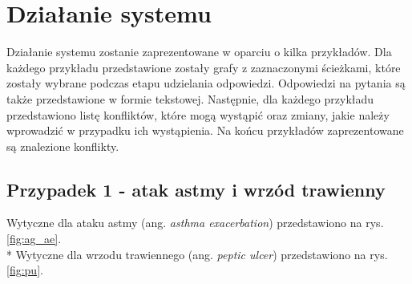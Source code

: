 \chapter{Działanie systemu}
Działanie systemu zostanie zaprezentowane w oparciu o kilka przykładów. Dla każdego przykładu przedstawione zostały grafy z zaznaczonymi ścieżkami, które zostały wybrane podczas etapu udzielania odpowiedzi. Odpowiedzi na pytania są także przedstawione w formie tekstowej. Następnie, dla każdego przykładu przedstawiono listę konfliktów, które mogą wystąpić oraz zmiany, jakie należy wprowadzić w przypadku ich wystąpienia. Na końcu przykładów zaprezentowane są znalezione konflikty.


\section{Przypadek 1 - atak astmy i wrzód trawienny}
Wytyczne dla ataku astmy (ang. \textit{asthma exacerbation}) przedstawiono na rys. \ref{fig:ag_ae}.\\*
Wytyczne dla wrzodu trawiennego (ang. \textit{peptic ulcer}) przedstawiono na rys. \ref{fig:pu}.



